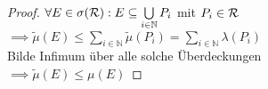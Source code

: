 \documentclass[11pt,a4paper,fleqn,openany]{report}
\begin{document}
    \begin{proof}
      $\forall E \in \sigma(\mathcal{R}): E \subseteq \bigcup\limits_{i \in \mathbb{N}} P_i$ mit $P_i \in \mathcal{R}$\\
      $\implies \tilde{\mu}(E) \leq \sum\limits_{i \in \mathbb{N}} \tilde{\mu}(P_i) = \sum\limits_{i \in \mathbb{N}} \lambda(P_i)$\\
      Bilde Infimum über alle solche Überdeckungen\\
      $\implies \tilde{\mu}(E) \leq \mu(E)$ 
    \end{proof}
\end{document}
